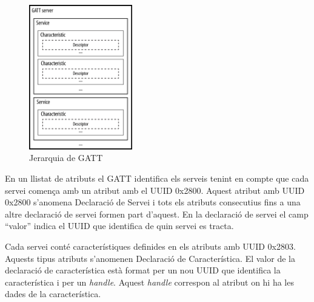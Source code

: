 \begin{figure}[h!]
	\begin{center}
		\includegraphics[width=0.4\textwidth]{./images/GATT_Hierarchy.png}
		\caption{Jerarquia de GATT \cite{GATT_Hierarchy}}
		\label{fig:Gatt_Hierarchy}
	\end{center}
\end{figure}

En un llistat de atributs el GATT identifica els serveis tenint en compte que cada servei comença amb un atribut amb el UUID 0x2800.
Aquest atribut amb UUID 0x2800 s'anomena Declaració de Servei i tots els atributs consecutius fins a una altre declaració de servei formen part d'aquest.
En la declaració de servei el camp ``valor'' indica el UUID que identifica de quin servei es tracta.

Cada servei conté característiques \cite{characteristics} definides en els atributs amb UUID 0x2803.
Aquests tipus atributs s'anomenen Declaració de Característica.
El valor de la declaració de característica està format per un nou UUID que identifica la característica i per un \textit{handle}.
Aquest \textit{handle} correspon al atribut on hi ha les dades de la característica.

